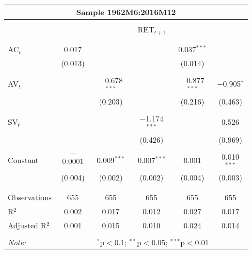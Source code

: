 
\begin{tabular}{lccccc} 
	\multicolumn{6}{c}{Sample 1962M6:2016M12}\\
	\hline\\
	& \multicolumn{5}{c}{RET$_{t+1}$} \\ 
	\\[-1.8ex] 
	\hline \\[-1.8ex] 
 AC$_{t}$ & 0.017 &  &  & 0.037$^{***}$ &  \\ 
 & (0.013) &  &  & (0.014) &  \\ 
 & & & & & \\ 
 AV$_{t}$ &  & $-$0.678$^{***}$ &  & $-$0.877$^{***}$ & $-$0.905$^{*}$ \\ 
 &  & (0.203) &  & (0.216) & (0.463) \\ 
 & & & & & \\ 
 SV$_{t}$ &  &  & $-$1.174$^{***}$ &  & 0.526 \\ 
 &  &  & (0.426) &  & (0.969) \\ 
 & & & & & \\ 
 Constant & $-$0.0001 & 0.009$^{***}$ & 0.007$^{***}$ & 0.001 & 0.010$^{***}$ \\ 
 & (0.004) & (0.002) & (0.002) & (0.004) & (0.003) \\ 
 & & & & & \\ 
 \hline \\[-1.8ex] 
 Observations & 655 & 655 & 655 & 655 & 655 \\ 
 R$^{2}$ & 0.002 & 0.017 & 0.012 & 0.027 & 0.017 \\ 
 Adjusted R$^{2}$ & 0.001 & 0.015 & 0.010 & 0.024 & 0.014 \\ 
\hline 
\hline \\[-1.8ex] 
\textit{Note:}  & \multicolumn{4}{r}{$^{*}$p$<$0.1; $^{**}$p$<$0.05; $^{***}$p$<$0.01} \\ 
\end{tabular} 
